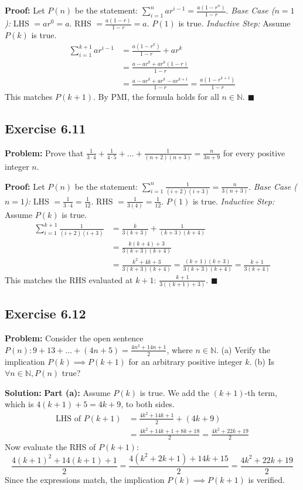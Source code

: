 \documentclass[11pt, a4paper]{article}
\theoremstyle{definition}
\theoremstyle{remark}
\newcommand{\N}{\mathbb{N}}
\begin{document}
\textbf{Proof:}
Let $P(n)$ be the statement: $\sum_{i=1}^n ar^{i-1} = \frac{a(1-r^n)}{1-r}$.
\textit{Base Case ($n=1$):} LHS $= ar^0 = a$. RHS $= \frac{a(1-r)}{1-r} = a$. $P(1)$ is true.
\textit{Inductive Step:} Assume $P(k)$ is true.
\[
\begin{aligned}
\sum_{i=1}^{k+1} ar^{i-1} &= \frac{a(1-r^k)}{1-r} + ar^k \\
&= \frac{a - ar^k + ar^k(1-r)}{1-r} \\
&= \frac{a - ar^k + ar^k - ar^{k+1}}{1-r} = \frac{a(1-r^{k+1})}{1-r}
\end{aligned}
\]
This matches $P(k+1)$. By PMI, the formula holds for all $n \in \N$. \hfill $\blacksquare$

\subsection*{Exercise 6.11}
\textbf{Problem:} Prove that $\frac{1}{3 \cdot 4} + \frac{1}{4 \cdot 5} + \dots + \frac{1}{(n+2)(n+3)} = \frac{n}{3n+9}$ for every positive integer $n$.

\textbf{Proof:}
Let $P(n)$ be the statement: $\sum_{i=1}^n \frac{1}{(i+2)(i+3)} = \frac{n}{3(n+3)}$.
\textit{Base Case ($n=1$):} LHS $= \frac{1}{3 \cdot 4} = \frac{1}{12}$. RHS $= \frac{1}{3(4)} = \frac{1}{12}$. $P(1)$ is true.
\textit{Inductive Step:} Assume $P(k)$ is true.
\[
\begin{aligned}
\sum_{i=1}^{k+1} \frac{1}{(i+2)(i+3)} &= \frac{k}{3(k+3)} + \frac{1}{(k+3)(k+4)} \\
&= \frac{k(k+4) + 3}{3(k+3)(k+4)} \\
&= \frac{k^2 + 4k + 3}{3(k+3)(k+4)} = \frac{(k+1)(k+3)}{3(k+3)(k+4)} = \frac{k+1}{3(k+4)}
\end{aligned}
\]
This matches the RHS evaluated at $k+1$: $\frac{k+1}{3((k+1)+3)}$. \hfill $\blacksquare$

\subsection*{Exercise 6.12}
\textbf{Problem:} Consider the open sentence $P(n): 9 + 13 + \dots + (4n+5) = \frac{4n^2+14n+1}{2}$, where $n \in \N$.
(a) Verify the implication $P(k) \implies P(k+1)$ for an arbitrary positive integer $k$.
(b) Is $\forall n \in \N, P(n)$ true?

\textbf{Solution:}
\textbf{Part (a):} Assume $P(k)$ is true. We add the $(k+1)$-th term, which is $4(k+1)+5 = 4k+9$, to both sides.
\[
\begin{aligned}
\text{LHS of } P(k+1) &= \frac{4k^2+14k+1}{2} + (4k+9) \\
&= \frac{4k^2+14k+1 + 8k+18}{2} = \frac{4k^2+22k+19}{2}
\end{aligned}
\]
Now evaluate the RHS of $P(k+1)$:
\[
\frac{4(k+1)^2 + 14(k+1) + 1}{2} = \frac{4(k^2+2k+1) + 14k + 15}{2} = \frac{4k^2+22k+19}{2}
\]
Since the expressions match, the implication $P(k) \implies P(k+1)$ is verified.
\end{document}

